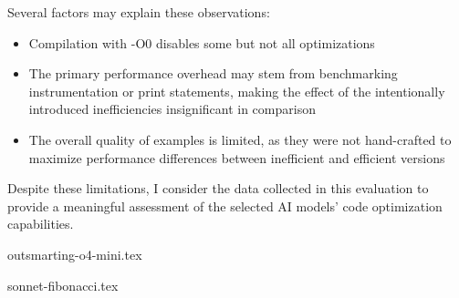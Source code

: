 Several factors may explain these observations:
\begin{itemize}[topsep=0pt]
  \item Compilation with -O0 disables some but not all optimizations
  \item The primary performance overhead may stem from benchmarking instrumentation or print statements, making the effect of the intentionally introduced inefficiencies insignificant in comparison
  \item The overall quality of examples is limited, as they were not hand-crafted to maximize performance differences between inefficient and efficient versions
\end{itemize}

\vspace{\baselineskip}
Despite these limitations, I consider the data collected in this evaluation to provide a meaningful assessment of the selected AI models' code optimization capabilities.

\begin{lstbox}{%
    \label{lst:outsmarting-o4-mini}
  }
  {outsmarting-o4-mini.tex}
\end{lstbox}%

\begin{lstbox}{%
    \label{lst:sonnet-fibonacci}
  }
  {sonnet-fibonacci.tex}
\end{lstbox}%
